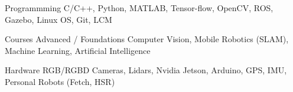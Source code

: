 

\begin{cvskills}

  \cvskill
    {Programmming} %
    {C/C++, Python, MATLAB, Tensor-flow, OpenCV, ROS, Gazebo, Linux OS, Git, LCM} %

	\cvskill
	{Courses} %
	{Advanced / Foundations Computer Vision, Mobile Robotics (SLAM), Machine Learning, Artificial Intelligence} %

	\cvskill
	{Hardware} %
	{RGB/RGBD Cameras, Lidars, Nvidia Jetson, Arduino, GPS, IMU, Personal Robots (Fetch, HSR)} %

\end{cvskills}
